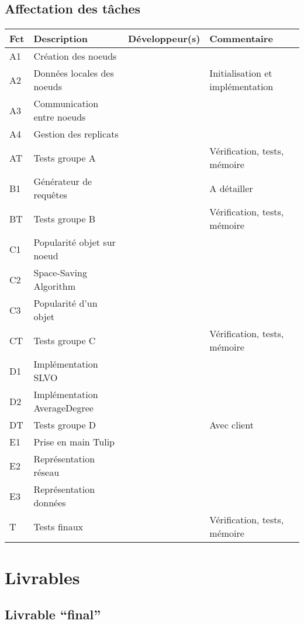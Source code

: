 \documentclass[12pt]{article}
\begin{document}
\newpage

\subsection{Affectation des tâches}

\paragraph{}
\begin{tabular}{| l | M{5cm} | M{3cm} | M{5.5cm} |}
    \hline
    Fct & Description & Développeur(s) & Commentaire \tabularnewline
    \hline
    A1 & Création des noeuds &  &   \tabularnewline
    \hline
    A2 & Données locales des noeuds &  & Initialisation et implémentation \tabularnewline
    \hline
    A3 & Communication entre noeuds &  &  \tabularnewline
    \hline
    A4 & Gestion des replicats &  &  \tabularnewline
    \hline
    AT & Tests groupe A &  &  Vérification, tests, mémoire \tabularnewline
    \hline 
    \hline
    B1 & Générateur de requêtes &  & A détailler  \tabularnewline
    \hline
    BT & Tests groupe B &  &  Vérification, tests, mémoire \tabularnewline
    \hline
    \hline
    C1 & Popularité objet sur noeud &  &  \tabularnewline
    \hline
    C2 & Space-Saving Algorithm &  &  \tabularnewline
    \hline
    C3 & Popularité d'un objet &  &  \tabularnewline
    \hline
    CT & Tests groupe C &  & Vérification, tests, mémoire \tabularnewline
    \hline
    \hline
    D1 & Implémentation SLVO &  &  \tabularnewline
    \hline
    D2 & Implémentation AverageDegree &  &  \tabularnewline
    \hline
    DT & Tests groupe D &  &  Avec client \tabularnewline
    \hline
    \hline
    E1 & Prise en main Tulip &  &  \tabularnewline
    \hline
    E2 & Représentation réseau &  &  \tabularnewline
    \hline
    E3 & Représentation données &  &  \tabularnewline
    \hline
    \hline
    T & Tests finaux &  &  Vérification, tests, mémoire \tabularnewline
    \hline
 \end{tabular}
 


\newpage

\section{Livrables}

\subsection{Livrable ``final''}
\end{document}
